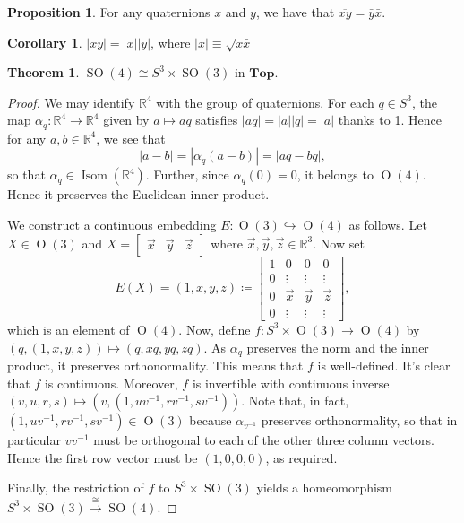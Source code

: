\documentclass[10pt,letterpaper,cm]{nupset}
\theoremstyle{definition}
\theoremstyle{theorem}
\newtheorem{theorem}[definition]{Theorem}
\newtheorem{cor}[definition]{Corollary}
\newtheorem{prop}[definition]{Proposition}
\theoremstyle{remark}
\newcommand{\R}{\mathbb R}
\newcommand{\1}{\mathbf{1}}
\newcommand{\x}{\vec x}
\newcommand{\y}{\vec y}
\newcommand{\z}{\vec z}
\newcommand{\0}{\vec {0}}
\DeclareMathOperator{\ORT}{O}
\DeclareMathOperator{\Isom}{Isom}
\DeclareMathOperator{\SO}{SO}
\begin{document}
\bigskip

\begin{prop}
For any quaternions $x$ and $y$, we have that $\overline{xy}=\bar{y}\bar{x}$.
\end{prop}

\begin{cor}\label{mult}
$\left\lvert{xy}\right\rvert=\left\lvert{x}\right\rvert \left\lvert{y}\right\rvert$, where $\left\lvert{x}\right\rvert\equiv \sqrt{x\bar{x}}$
\end{cor}
 

\begin{theorem}
$\SO(4) \cong S^3\times \SO(3)$ in $\mathbf{Top}$.
\end{theorem}

\begin{proof}
We may identify $\R^4$ with the group of quaternions. For each $q\in S^3$, the map $\alpha_q :\R^4\to \R^4$ given by $a\mapsto aq$ satisfies $\left\lvert{aq}\right\rvert=\left\lvert{a}\right\rvert\left\lvert{q}\right\rvert=\left\lvert{a}\right\rvert$ thanks to \cref{mult}. Hence for any $a,b\in \R^4$, we see that $$\left\lvert{a-b}\right\rvert=\left\lvert{\alpha_q(a-b)}\right\rvert=\left\lvert{aq-bq}\right\rvert,$$ so that $\alpha_q \in \Isom(\R^4)$. Further, since $\alpha_q(0)=0$, it belongs to $\ORT(4)$. Hence it preserves the Euclidean inner product.

\smallskip

We construct a continuous embedding $E : \ORT(3)\hookrightarrow \ORT(4)$ as follows. Let $X\in \ORT(3)$ and $X=\begin{bmatrix} \x & \y & \z \end{bmatrix}$ where $\x, \y, \z \in \R^3$. Now set $$E(X)=\left(1, x, y, z\right)\coloneqq \begin{bmatrix} 1 & 0 & 0 & 0 \\ 0 &  \vdots & \vdots & \vdots \\ 0 &\x & \y & \z  \\ 0 & \vdots & \vdots & \vdots \end{bmatrix},$$ which is an element of $\ORT (4)$. Now, define $f: S^3\times \ORT(3) \to \ORT(4)$ by $\left(q, \left(1,x, y, z\right)\right)\mapsto \left(q, xq, yq, zq\right)$. As $\alpha_q$ preserves the norm and the inner product, it preserves orthonormality. This means that $f$ is well-defined.  It's clear that $f$ is continuous. Moreover, $f$ is invertible with continuous inverse $\left(v, u, r, s\right)\mapsto \left(v, \left(1, uv^{-1}, rv^{-1}, sv^{-1}\right)\right)$. Note that, in fact, $\left(1, uv^{-1}, rv^{-1}, sv^{-1}\right)\in \ORT(3)$ because $\alpha_{v^{-1}}$ preserves orthonormality, so that in particular $vv^{-1}$ must be orthogonal to each of the other three column vectors. Hence the first row vector must be $\left(1,0,0,0\right)$, as required.  

\smallskip

Finally, the restriction of $f$ to $S^3 \times \SO(3)$ yields a homeomorphism $S^3\times \SO(3) \xrightarrow{\cong} \SO(4)$.  
\end{proof}
\end{document}
